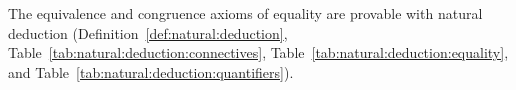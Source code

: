 %
\begin{lemma}\label{lemma:equivalence:congruence}
The equivalence and congruence axioms of equality are provable with natural deduction
(Definition~\vref{def:natural:deduction},
Table~\vref{tab:natural:deduction:connectives},
Table~\vref{tab:natural:deduction:equality},
and Table~\vref{tab:natural:deduction:quantifiers}).
\end{lemma}
